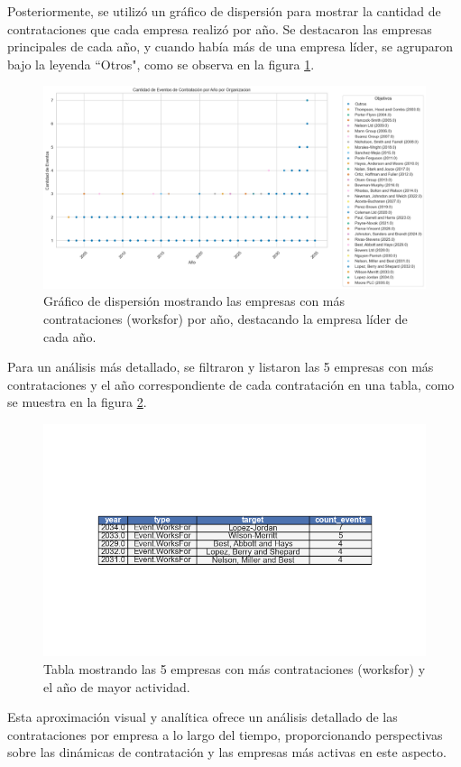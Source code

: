\documentclass[11pt,spanish,a4paper]{article}
\begin{document}
Posteriormente, se utilizó un gráfico de dispersión para mostrar la cantidad de contrataciones que cada empresa realizó por año. Se destacaron las empresas principales de cada año, y cuando había más de una empresa líder, se agruparon bajo la leyenda ``Otros", como se observa en la figura \ref{fig:dispersion_contrataciones}.

\begin{figure}[H]
  \centering
  \includegraphics[width=0.7\linewidth]{graphs/dispersion_contrataciones_top_anio.png}
  \caption{Gráfico de dispersión mostrando las empresas con más contrataciones (worksfor) por año, destacando la empresa líder de cada año.}
  \label{fig:dispersion_contrataciones}
\end{figure}

Para un análisis más detallado, se filtraron y listaron las 5 empresas con más contrataciones y el año correspondiente de cada contratación en una tabla, como se muestra en la figura \ref{fig:top_contrataciones}.

\begin{figure}[H]
  \centering
  \includegraphics[width=0.7\linewidth]{graphs/tabla_top_contratasciones_anio.png}
  \caption{Tabla mostrando las 5 empresas con más contrataciones (worksfor) y el año de mayor actividad.}
  \label{fig:top_contrataciones}
\end{figure}

Esta aproximación visual y analítica ofrece un análisis detallado de las contrataciones por empresa a lo largo del tiempo, proporcionando perspectivas sobre las dinámicas de contratación y las empresas más activas en este aspecto.
\end{document}
